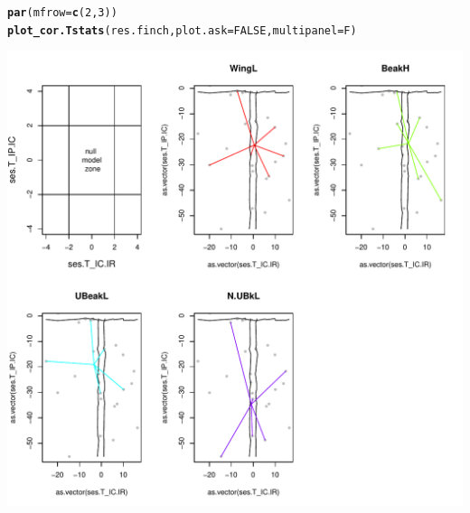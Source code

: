 \documentclass[12pt]{article}\usepackage[]{graphicx}\usepackage[]{color}
\makeatletter
\def\maxwidth{ %
  \ifdim\Gin@nat@width>\linewidth
    \linewidth
  \else
    \Gin@nat@width
  \fi
}
\newcommand{\hlnum}[1]{\textcolor[rgb]{0.686,0.059,0.569}{#1}}%
\newcommand{\hlstd}[1]{\textcolor[rgb]{0.345,0.345,0.345}{#1}}%
\newcommand{\hlkwc}[1]{\textcolor[rgb]{0.333,0.667,0.333}{#1}}%
\newcommand{\hlkwd}[1]{\textcolor[rgb]{0.737,0.353,0.396}{\textbf{#1}}}%
\newenvironment{kframe}{%
 \def\at@end@of@kframe{}%
 \ifinner\ifhmode%
  \def\at@end@of@kframe{\end{minipage}}%
  \begin{minipage}{\columnwidth}%
 \fi\fi%
 \def\FrameCommand##1{\hskip\@totalleftmargin \hskip-\fboxsep
 \colorbox{shadecolor}{##1}\hskip-\fboxsep
     \hskip-\linewidth \hskip-\@totalleftmargin \hskip\columnwidth}%
 \MakeFramed {\advance\hsize-\width
   \@totalleftmargin\z@ \linewidth\hsize
   \@setminipage}}%
 {\par\unskip\endMakeFramed%
 \at@end@of@kframe}
\newenvironment{knitrout}{}{} %
\makeatother
\begin{document}
\begin{knitrout}
\color{fgcolor}\begin{kframe}
\begin{alltt}
\hlkwd{par}\hlstd{(}\hlkwc{mfrow} \hlstd{=} \hlkwd{c}\hlstd{(}\hlnum{2}\hlstd{,} \hlnum{3}\hlstd{))}
\hlkwd{plot_cor.Tstats}\hlstd{(res.finch,} \hlkwc{plot.ask} \hlstd{=} \hlnum{FALSE}\hlstd{,} \hlkwc{multipanel} \hlstd{= F)}
\end{alltt}


{\ttfamily\noindent\color{warningcolor}{\#\# Warning: largeur de police inconnue pour le caractère 0xd\\\#\# Warning: largeur de police inconnue pour le caractère 0xd}}\end{kframe}
\includegraphics[width=\maxwidth]{figure/unnamed-chunk-251} 
\begin{kframe}


\end{kframe}
\end{knitrout}
\end{document}
